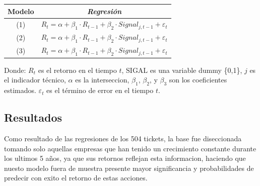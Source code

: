 \documentclass[a0,portrait]{a0poster}
\newcommand{\customsection}[1]{
    \begin{center}
        \begin{tcolorbox}[colframe=miRojo!50, colback=miRojo, width=\linewidth, boxrule=1mm, arc=3mm, auto outer arc]
            \centering
            \vspace{.5cm} %
            \color{white}
            \section*{ \textbf{\Huge #1}}  %
            \vspace{.5cm} %
        \end{tcolorbox}
    \end{center}
}
\begin{document}
\begin{multicols}{2}
\begin{minipage}{.984\linewidth}
\begin{tabular}{cl}
        \textbf{Modelo} & \multicolumn{1}{c}{\textbf{\textit{Regresión}}}   \\
        \midrule
        (1) & $R_t = \alpha +\beta_1 \cdot R_{t-1} + \beta_2 \cdot Signal_{j,t-1} + \varepsilon_t$ \\
        (2) & $R_t = \alpha +\beta_1 \cdot R_{t-1} + \beta_2 \cdot Signal_{j,t-1} +  \varepsilon_t$ \\
        (3) & $R_t = \alpha +\beta_1 \cdot R_{t-1} + \beta_2 \cdot Signal_{j,t-1} + \varepsilon_t$ \\
        \bottomrule
    \end{tabular}
    \captionsetup{width=0.8\textwidth}  %
    \caption*{\footnotesize Donde: $R_t$ es el retorno en el tiempo $t$, $\text{SIGAL}$ es una variable dummy \{0,1\}, $j$ es 
    el indicador técnico,     $\alpha$ es la interseccion, $\beta_1$, $\beta_2$, y $\beta_3$ son los coeficientes estimados.
    $\varepsilon_t$ es el término de error en el tiempo $t$.    }  %
    \vspace{.5cm}
    \end{minipage}
       
                
                
    \customsection{Resultados}
    \par 
     \normalsize
    Como resultado de las regresiones de los 504 tickets, la base fue diseccionada tomando solo aquellas empresas 
    que han tenido un crecimiento constante durante los ultimos 5 años, ya que sus retornos reflejan esta informacion, 
    haciendo que nuesto modelo fuera de muestra presente mayor significancia y probabilidades de predecir con exito el 
    retorno de estas acciones.
    

    \vspace{1cm}

\end{multicols}
\end{document}
